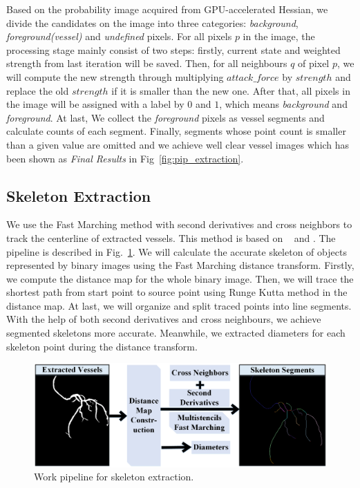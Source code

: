 \documentclass[journal]{IEEEtran}
\begin{document}
Based on the probability image acquired from GPU-accelerated Hessian, we divide the candidates on the image into three categories: \textit{background}, \textit{foreground(vessel)} and \textit{undefined} pixels. For all pixels $p$ in the image, the processing stage mainly consist of two steps: firstly, current state and weighted strength from last iteration will be saved. Then, for all neighbours $q$ of pixel $p$, we will compute the new strength through multiplying $attack\_force$ by $strength$ and replace the old $strength$ if it is smaller than the new one. After that, all pixels in the image will be assigned with a label by $0$ and $1$, which means \textit{background} and \textit{foreground}. At last, We collect the \textit{foreground} pixels as vessel segments and calculate counts of each segment. Finally, segments whose point count is smaller than a given value are omitted and we achieve well clear vessel images which has been shown as \textit{Final Results} in Fig~\ref{fig:pip_extraction}.


\subsection{Skeleton Extraction}
\label{subsec:skeleton-extraction}
We use the Fast Marching method with second derivatives and cross neighbors to track the centerline of extracted vessels. This method is based on ~\cite{IMM2001-0841} and \cite{hassouna2007multistencils}. The pipeline is described in Fig.~\ref{fig:skel_extraction}. We will calculate the accurate skeleton of objects represented by binary images using the Fast Marching distance transform. Firstly, we compute the distance map for the whole binary image. Then, we will trace the shortest path from start point to source point using Runge Kutta method in the distance map. At last, we will organize and split traced points into line segments. With the help of both second derivatives and cross neighbours, we achieve segmented skeletons more accurate. Meanwhile, we extracted diameters for each skeleton point during the distance transform.

\begin{figure}[!t]
\centering
\includegraphics[width=1.0\linewidth]{./images/basis2-pipeline.png}
\caption{Work pipeline for skeleton extraction.}
\label{fig:skel_extraction}
\end{figure}
\end{document}
